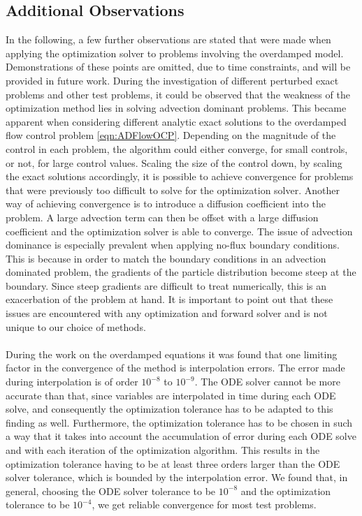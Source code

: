 \documentclass[11pt, a4paper]{article}
\theoremstyle{definition}
\begin{document}
\subsection{Additional Observations}
In the following, a few further observations are stated that were made when applying the optimization solver to problems involving the overdamped model. Demonstrations of these points are omitted, due to time constraints, and will be provided in future work.
During the investigation of different perturbed exact problems and other test problems, it could be observed that the weakness of the optimization method lies in solving advection dominant problems. 
This became apparent when considering different analytic exact solutions to the overdamped flow control problem \eqref{eqn:ADFlowOCP}. Depending on the magnitude of the control in each problem, the algorithm could either converge, for small controls, or not, for large control values. Scaling the size of the control down, by scaling the exact solutions accordingly, it is possible to achieve convergence for problems that were previously too difficult to solve for the optimization solver. Another way of achieving convergence is to introduce a diffusion coefficient into the problem. A large advection term can then be offset with a large diffusion coefficient and the optimization solver is able to converge.
The issue of advection dominance is especially prevalent when applying no-flux boundary conditions. This is because in order to match the boundary conditions in an advection dominated problem, the gradients of the particle distribution become steep at the boundary. Since steep gradients are difficult to treat numerically, this is an exacerbation of the problem at hand.
It is important to point out that these issues are encountered with any optimization and forward solver and is not unique to our choice of methods. 
\\
\\
During the work on the overdamped equations it was found that one limiting factor in the convergence of the method is interpolation errors. The error made during interpolation is of order $10^{-8}$ to $10^{-9}$. The ODE solver cannot be more accurate than that, since variables are interpolated in time during each ODE solve, and consequently the optimization tolerance has to be adapted to this finding as well.
Furthermore, the optimization tolerance has to be chosen in such a way that it takes into account the accumulation of error during each ODE solve and with each iteration of the optimization algorithm. This results in the optimization tolerance having to be at least three orders larger than the ODE solver tolerance, which is bounded by the interpolation error. We found that, in general, choosing the ODE solver tolerance to be $10^{-8}$ and the optimization tolerance to be $10^{-4}$, we get reliable convergence for most test problems.
\end{document}
